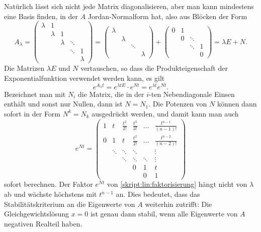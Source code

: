Natürlich lässt sich nicht jede Matrix diagonalisieren, aber man kann
mindestens eine Basis finden, in der $A$ Jordan-Normalform hat, also aus
Blöcken der Form
\[
A_{\lambda}
=
\begin{pmatrix}
\lambda&   1   &       &       &       \\
       &\lambda&   1   &       &       \\
       &       &\lambda&\ddots &       \\
       &       &       &\ddots &    1  \\
       &       &       &       &\lambda
\end{pmatrix}
=
\begin{pmatrix}
\lambda&       &       &       \\
       &\lambda&       &       \\
       &       &\ddots &       \\
       &       &       &\lambda
\end{pmatrix}
+
\begin{pmatrix}
   0   &   1   &       &       \\
       &   0   &\ddots &       \\
       &       &\ddots &   1   \\
       &       &       &   0
\end{pmatrix}
=
\lambda E + N.
\]
Die Matrizen $\lambda E$ und $N$ vertauschen, so dass die
Produkteigenschaft der Exponentialfunktion verwendet werden kann,
es gilt
\begin{equation}
e^{A_\lambda t}
=
e^{\lambda tE}\cdot e^{Nt}
=
e^{\lambda t} e^{Nt}.
\label{skript:lin:faktorisierung}
\end{equation}
Bezeichnet man mit $N_i$ die Matrix, die in der $i$-ten Nebendiagonale
Einsen enthält und sonst nur Nullen, dann ist $N=N_1$.
Die Potenzen von $N$ können dann sofort in der Form $N^k=N_k$ ausgedrückt
werden, und damit kann man auch
\begin{equation}
e^{Nt}
=
\begin{pmatrix}
1&t&\frac{t^2}{2!}&\frac{t^3}{3!}& \dots & \frac{t^{n-1}}{(n-1)!}\\
0&1&       t      &\frac{t^2}{2!}& \dots & \frac{t^{n-2}}{(n-2)!}\\
      &\ddots&\ddots& \ddots     &       & \vdots                \\
      &      &\ddots& \ddots     &\ddots & \vdots                \\
      &      &      &         0  &    1  & t \\
      &      &      &            &    0  & 1
\end{pmatrix}
\end{equation}
sofort berechnen.
Der Faktor $e^{Nt}$ von \eqref{skript:lin:faktorisierung}
hängt nicht von $\lambda$ ab und wächste höchstens mit $t^{n-1}$ an.
Dies bedeutet, dass das Stabilitätskriterium an die Eigenwerte von $A$
weiterhin zutrifft: Die Gleichgewichtslösung $x=0$ ist genau dann stabil,
wenn alle Eigenwerte von $A$ negativen Realteil haben.

